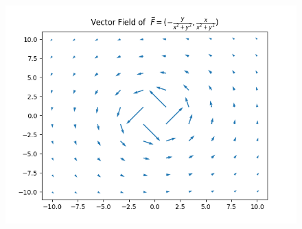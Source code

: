\documentclass[UTF8]{ctexart}
\begin{document}
\begin{figure}
    \centering
    \includegraphics[width=0.75\linewidth]{Figure_1.png}
\end{figure}
\end{document}
